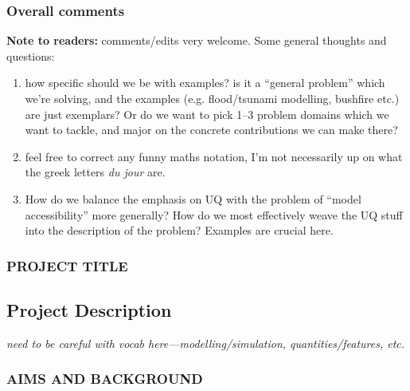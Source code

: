 \documentclass[a4paper,fontsize=12pt]{scrartcl}
\author{}
\date{\today}
\begin{document}
\subsubsection{Overall comments}
\label{sec:overall-comments}

\noindent
\textbf{Note to readers:} comments/edits very welcome. Some general
thoughts and questions:
\begin{enumerate}
\item how specific should we be with examples? is it a ``general
  problem'' which we're solving, and the examples (e.g. flood/tsunami
  modelling, bushfire etc.) are just exemplars? Or do we want to pick
  1--3 problem domains which we want to tackle, and major on the
  concrete contributions we can make there?
\item feel free to correct any funny maths notation, I'm not
  necessarily up on what the greek letters \emph{du jour} are.
\item How do we balance the emphasis on UQ with the problem of ``model
  accessibility'' more generally? How do we most effectively weave the
  UQ stuff into the description of the problem? Examples are crucial here.
\end{enumerate}

\renewcommand{\thesection}{\Alph{section}}

\subsubsection*{PROJECT TITLE}

\setcounter{section}{3} %
\subsection{Project Description}
\label{sec:project-description}

\emph{need to be careful with vocab here---modelling/simulation,
  quantities/features, etc.}

\subsubsection*{AIMS AND BACKGROUND}
\end{document}
